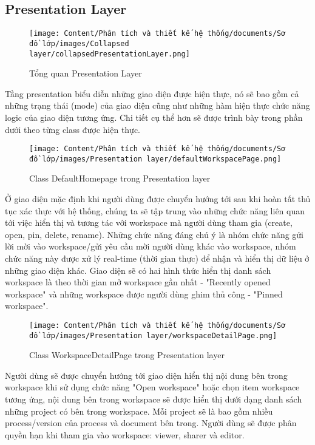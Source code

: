 \subsection{Presentation Layer}
\begin{figure}[H]
    \centering
    \texttt{[image: Content/Phân tích và thiết kế hệ thống/documents/Sơ đồ lớp/images/Collapsed layer/collapsedPresentationLayer.png]}
    \vspace{0.5cm}
    \caption{Tổng quan Presentation Layer}
    \label{fig:Tổng quan Presentation layer}
\end{figure}
Tầng presentation biểu diễn những giao diện được hiện thực, nó sẽ bao gồm cả những trạng thái (mode) của giao diện cũng như những hàm hiện thực chức năng logic của giao diện tương ứng.
Chi tiết cụ thể hơn sẽ được trình bày trong phần dưới theo từng class được hiện thực.

\begin{figure}[H]
    \centering
    \texttt{[image: Content/Phân tích và thiết kế hệ thống/documents/Sơ đồ lớp/images/Presentation layer/defaultWorkspacePage.png]}
    \vspace{0.5cm}
    \caption{Class DefaultHomepage trong Presentation layer}
    \label{fig:Class Default homepage trong Presentation layer}
\end{figure}
Ở giao diện mặc định khi người dùng được chuyển hướng tới sau khi hoàn tất thủ tục xác thực với hệ thống, chúng ta sẽ tập trung vào những chức năng liên quan tới việc hiển thị và tương tác với workspace mà người dùng tham gia (create, open, pin, delete, rename). Những chức năng đáng chú ý là nhóm chức năng gửi lời mời vào workspace/gửi yêu cầu mời người dùng khác vào workspace, nhóm chức năng này được xử lý real-time (thời gian thực) để nhận và hiển thị dữ liệu ở những giao diện khác. Giao diện sẽ có hai hình thức hiển thị danh sách workspace là theo thời gian mở workspace gần nhất - "Recently opened workspace" và những workspace được người dùng ghim thủ công - "Pinned workspace".

\begin{figure}[H]
    \centering
    \texttt{[image: Content/Phân tích và thiết kế hệ thống/documents/Sơ đồ lớp/images/Presentation layer/workspaceDetailPage.png]}
    \vspace{0.5cm}
    \caption{Class WorkspaceDetailPage trong Presentation layer}
    \label{fig:Class WorkspaceDetailPage trong Presentation layer}
\end{figure}
Người dùng sẽ được chuyển hướng tới giao diện hiển thị nội dung bên trong workspace khi sử dụng chức năng "Open workspace" hoặc chọn item workspace tương ứng, nội dung bên trong workspace sẽ được hiển thị dưới dạng danh sách những project có bên trong workspace. Mỗi project sẽ là bao gồm nhiều process/version của process và document bên trong. Người dùng sẽ được phân quyền hạn khi tham gia vào workspace: viewer, sharer và editor.

